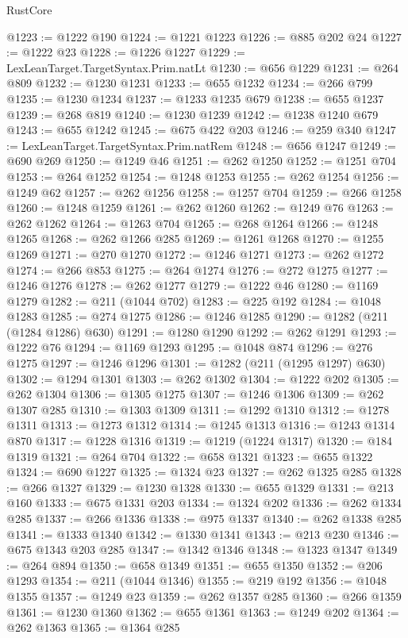\begin{lexlean}{RustCore}
\begin{coremodule}
@1223 := @1222 @190
@1224 := @1221 @1223
@1226 := @885 @202 @24
@1227 := @1222 @23
@1228 := @1226 @1227
@1229 := LexLeanTarget.TargetSyntax.Prim.natLt
@1230 := @656 @1229
@1231 := @264 @809
@1232 := @1230 @1231
@1233 := @655 @1232
@1234 := @266 @799
@1235 := @1230 @1234
@1237 := @1233 @1235 @679
@1238 := @655 @1237
@1239 := @268 @819
@1240 := @1230 @1239
@1242 := @1238 @1240 @679
@1243 := @655 @1242
@1245 := @675 @422 @203
@1246 := @259 @340
@1247 := LexLeanTarget.TargetSyntax.Prim.natRem
@1248 := @656 @1247
@1249 := @690 @269
@1250 := @1249 @46
@1251 := @262 @1250
@1252 := @1251 @704
@1253 := @264 @1252
@1254 := @1248 @1253
@1255 := @262 @1254
@1256 := @1249 @62
@1257 := @262 @1256
@1258 := @1257 @704
@1259 := @266 @1258
@1260 := @1248 @1259
@1261 := @262 @1260
@1262 := @1249 @76
@1263 := @262 @1262
@1264 := @1263 @704
@1265 := @268 @1264
@1266 := @1248 @1265
@1268 := @262 @1266 @285
@1269 := @1261 @1268
@1270 := @1255 @1269
@1271 := @270 @1270
@1272 := @1246 @1271
@1273 := @262 @1272
@1274 := @266 @853
@1275 := @264 @1274
@1276 := @272 @1275
@1277 := @1246 @1276
@1278 := @262 @1277
@1279 := @1222 @46
@1280 := @1169 @1279
@1282 := @211 (@1044 @702)
@1283 := @225 @192
@1284 := @1048 @1283
@1285 := @274 @1275
@1286 := @1246 @1285
@1290 := @1282 (@211 (@1284 @1286) @630)
@1291 := @1280 @1290
@1292 := @262 @1291
@1293 := @1222 @76
@1294 := @1169 @1293
@1295 := @1048 @874
@1296 := @276 @1275
@1297 := @1246 @1296
@1301 := @1282 (@211 (@1295 @1297) @630)
@1302 := @1294 @1301
@1303 := @262 @1302
@1304 := @1222 @202
@1305 := @262 @1304
@1306 := @1305 @1275
@1307 := @1246 @1306
@1309 := @262 @1307 @285
@1310 := @1303 @1309
@1311 := @1292 @1310
@1312 := @1278 @1311
@1313 := @1273 @1312
@1314 := @1245 @1313
@1316 := @1243 @1314 @870
@1317 := @1228 @1316
@1319 := @1219 (@1224 @1317)
@1320 := @184 @1319
@1321 := @264 @704
@1322 := @658 @1321
@1323 := @655 @1322
@1324 := @690 @1227
@1325 := @1324 @23
@1327 := @262 @1325 @285
@1328 := @266 @1327
@1329 := @1230 @1328
@1330 := @655 @1329
@1331 := @213 @160
@1333 := @675 @1331 @203
@1334 := @1324 @202
@1336 := @262 @1334 @285
@1337 := @266 @1336
@1338 := @975 @1337
@1340 := @262 @1338 @285
@1341 := @1333 @1340
@1342 := @1330 @1341
@1343 := @213 @230
@1346 := @675 @1343 @203 @285
@1347 := @1342 @1346
@1348 := @1323 @1347
@1349 := @264 @894
@1350 := @658 @1349
@1351 := @655 @1350
@1352 := @206 @1293
@1354 := @211 (@1044 @1346)
@1355 := @219 @192
@1356 := @1048 @1355
@1357 := @1249 @23
@1359 := @262 @1357 @285
@1360 := @266 @1359
@1361 := @1230 @1360
@1362 := @655 @1361
@1363 := @1249 @202
@1364 := @262 @1363
@1365 := @1364 @285

\end{coremodule}
\end{lexlean}
